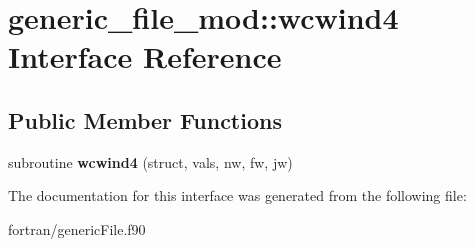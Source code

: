 \hypertarget{interfacegeneric__file__mod_1_1wcwind4}{}\section{generic\+\_\+file\+\_\+mod\+:\+:wcwind4 Interface Reference}
\label{interfacegeneric__file__mod_1_1wcwind4}
\subsection*{Public Member Functions}
\begin{DoxyCompactItemize}
\item 
\mbox{\label{interfacegeneric__file__mod_1_1wcwind4_a8c72af93e8259b0dddafeb6770e41992}} 
subroutine {\bfseries wcwind4} (struct, vals, nw, fw, jw)
\end{DoxyCompactItemize}


The documentation for this interface was generated from the following file\+:\begin{DoxyCompactItemize}
\item 
fortran/generic\+File.\+f90\end{DoxyCompactItemize}

